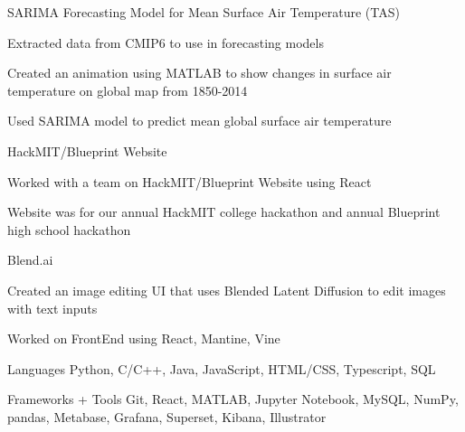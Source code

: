 \documentclass[12pt, letterpaper]{awesome-cv}
\begin{document}
\begin{cventries}
  \cventry
    {} %
    {SARIMA Forecasting Model for Mean Surface Air Temperature (TAS)} %
    {} %
    {} %
    {
      \vspace{-0.2in}
      \begin{cvitems} %
        \item {Extracted data from CMIP6 to use in forecasting models}
        \item {Created an animation using MATLAB to show changes in surface air temperature on global map from 1850-2014}
        \item {Used SARIMA model to predict mean global surface air temperature}
      \end{cvitems}
    }

  \cventry
    {} %
    {HackMIT/Blueprint Website} %
    {} %
    {} %
    {
      \vspace{-0.25in}
      \begin{cvitems} %
        \item {Worked with a team on HackMIT/Blueprint Website using React}
        \item {Website was for our annual HackMIT college hackathon and annual Blueprint high school hackathon}
      \end{cvitems}
    }

  \cventry
    {} %
    {Blend.ai} %
    {} %
    {} %
    {
      \vspace{-0.25in}
      \begin{cvitems} %
        \item {Created an image editing UI that uses Blended Latent Diffusion to edit images with text inputs}
        \item {Worked on FrontEnd using React, Mantine, Vine}
      \end{cvitems}
    }
\end{cventries}

\begin{cvskills}
  \cvskill
    {Languages} %
    {Python, C/C++, Java, JavaScript, HTML/CSS, Typescript, SQL} %

  \cvskill
    {Frameworks + Tools} %
    {Git, React, MATLAB, Jupyter Notebook, MySQL, NumPy, pandas, Metabase, Grafana, Superset, Kibana, Illustrator} %
  
    
\end{cvskills}

\end{document}
